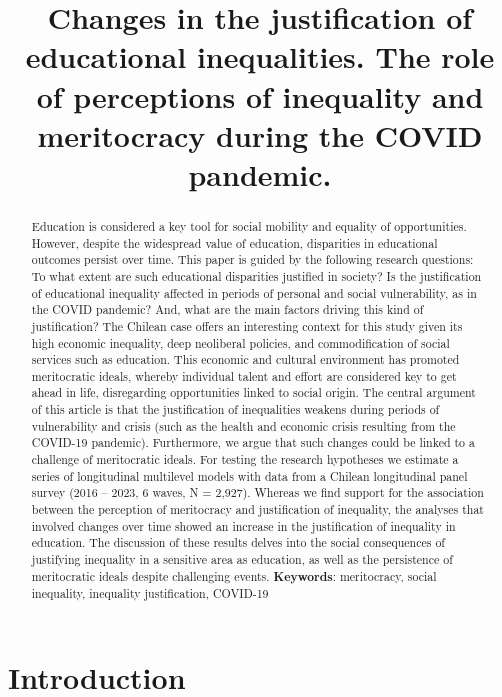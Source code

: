 \documentclass[
]{article}
\title{Changes in the justification of educational inequalities. The
role of perceptions of inequality and meritocracy during the COVID
pandemic.}
\author{ }
\date{}
\begin{document}
\maketitle
\begin{abstract}
Education is considered a key tool for social mobility and equality of
opportunities. However, despite the widespread value of education,
disparities in educational outcomes persist over time. This paper is
guided by the following research questions: To what extent are such
educational disparities justified in society? Is the justification of
educational inequality affected in periods of personal and social
vulnerability, as in the COVID pandemic? And, what are the main factors
driving this kind of justification? The Chilean case offers an
interesting context for this study given its high economic inequality,
deep neoliberal policies, and commodification of social services such as
education. This economic and cultural environment has promoted
meritocratic ideals, whereby individual talent and effort are considered
key to get ahead in life, disregarding opportunities linked to social
origin. The central argument of this article is that the justification
of inequalities weakens during periods of vulnerability and crisis (such
as the health and economic crisis resulting from the COVID-19 pandemic).
Furthermore, we argue that such changes could be linked to a challenge
of meritocratic ideals. For testing the research hypotheses we estimate
a series of longitudinal multilevel models with data from a Chilean
longitudinal panel survey (2016 -- 2023, 6 waves, N = 2,927). Whereas we
find support for the association between the perception of meritocracy
and justification of inequality, the analyses that involved changes over
time showed an increase in the justification of inequality in education.
The discussion of these results delves into the social consequences of
justifying inequality in a sensitive area as education, as well as the
persistence of meritocratic ideals despite challenging events.\newline
\textbf{Keywords}: meritocracy, social inequality, inequality
justification, COVID-19
\end{abstract}


\section{Introduction}\label{introduction}
\end{document}
